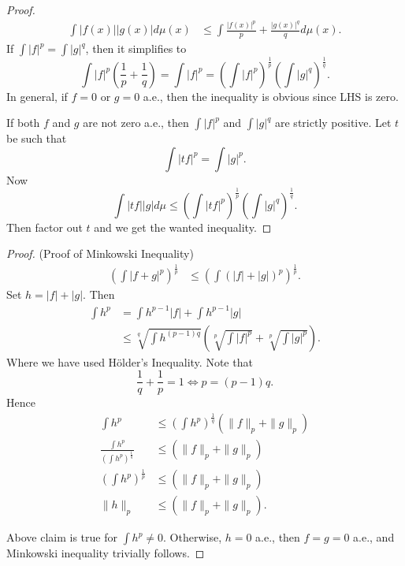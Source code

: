 \begin{proof}
	\begin{align*}
		\int |f(x)| |g(x)| d \mu(x)
		&\le \int \frac{|f(x)|^p}{p} + \frac{|g(x)|^q}{q} d \mu(x)
	.\end{align*}
	If $\int |f|^p = \int |g|^q$, then it simplifies to
	\[
		\int |f|^p \left( \frac{1}{p} + \frac{1}{q} \right)  = \int |f|^p  = \left( \int |f|^p \right) ^{\frac{1}{p}} \left( \int |g|^q \right) ^{\frac{1}{q}}
	.\] 
	In general, if $f = 0$ or $g = 0$ a.e., then the inequality is obvious since LHS is zero.

	If both $f$ and $g$ are not zero a.e., then $\int |f|^p$ and $\int |g|^q$ are strictly positive. Let $t$ be such that 
	\[
		\int |tf|^p = \int |g|^p
	.\] 
	Now
	\[
		\int |tf| |g| d \mu \le \left( \int |tf|^p \right) ^{\frac{1}{p}} \left( \int |g|^q \right) ^{\frac{1}{q}}
	.\] 
	Then factor out $t$ and we get the wanted inequality.
\end{proof}

\begin{proof}
	(Proof of Minkowski Inequality) 
	\begin{align*}
		\left( \int |f+g|^p \right) ^{\frac{1}{p}} 
		&\le \left( \int \left( |f| + |g| \right) ^p \right) ^{\frac{1}{p}} 
	.\end{align*}
	Set $h = |f| + |g|$. Then
\begin{align*}
	\int h^p &= \int h^{p-1} |f| + \int h^{p-1}|g| \\
		 &\le \sqrt[q]{\int h^{(p-1) q}} \left( \sqrt[p]{\int |f|^p} + \sqrt[p]{\int |g|^p}   \right)  
.\end{align*}
Where  we have used Hölder's Inequality. Note that
\[
	\frac{1}{q} + \frac{1}{p} = 1 \iff  p = (p-1)q
.\] 
Hence
\begin{align*}
	\int h^p &\le  \left( \int  h^p \right) ^{\frac{1}{q}} \left( \|f\|_p + \|g\|_p \right) \\
\frac{\int h^p}{ \left( \int  h^p \right) ^{\frac{1}{q}}} &\le  \left( \|f\|_p + \|g\|_p \right) \\
 \left( \int  h^p \right) ^{\frac{1}{p}} &\le  \left( \|f\|_p + \|g\|_p \right) \\
 \|h\|_p &\le  \left( \|f\|_p + \|g\|_p \right) 
.\end{align*}

Above claim is true for $\int  h^p \neq 0$. Otherwise,  $h = 0$ a.e., then $f = g = 0$ a.e., and Minkowski inequality trivially follows. 
\end{proof}

